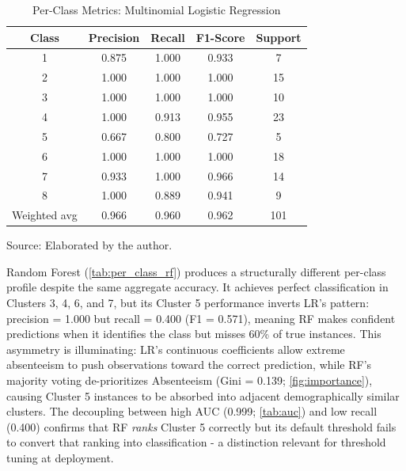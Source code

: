 \documentclass[alpha-refs,english]{RBCA_v3.0}
\begin{document}
\begin{table}[ht]
    \centering
    \begin{threeparttable}
    \caption{Per-Class Metrics: Multinomial Logistic Regression}
    \label{tab:per_class_lr}
    \begin{tabular}{ccccc}
        \toprule
        Class & Precision & Recall & F1-Score & Support \\
        \midrule
        1            & 0.875 & 1.000 & 0.933 & 7 \\
        2            & 1.000 & 1.000 & 1.000 & 15 \\
        3            & 1.000 & 1.000 & 1.000 & 10 \\
        4            & 1.000 & 0.913 & 0.955 & 23 \\
        5            & 0.667 & 0.800 & 0.727 & 5 \\
        6            & 1.000 & 1.000 & 1.000 & 18 \\
        7            & 0.933 & 1.000 & 0.966 & 14 \\
        8            & 1.000 & 0.889 & 0.941 & 9 \\
        \midrule
        Weighted avg & 0.966 & 0.960 & 0.962 & 101 \\
        \bottomrule
    \end{tabular}
    \begin{tablenotes}
        \footnotesize
        \item Source: Elaborated by the author.
    \end{tablenotes}
    \end{threeparttable}
\end{table}

Random Forest (\cref{tab:per_class_rf}) produces a structurally different 
per-class profile despite the same aggregate accuracy. It achieves perfect 
classification in Clusters 3, 4, 6, and 7, but its Cluster 5 performance 
inverts LR's pattern: precision = 1.000 but recall = 0.400 (F1 = 0.571), 
meaning RF makes confident predictions when it identifies the class but 
misses 60\% of true instances. This asymmetry is illuminating: LR's 
continuous coefficients allow extreme absenteeism to push observations 
toward the correct prediction, while RF's majority voting de-prioritizes 
Absenteeism (Gini = 0.139; \cref{fig:importance}), causing Cluster 5 
instances to be absorbed into adjacent demographically similar clusters. 
The decoupling between high AUC (0.999; \cref{tab:auc}) and low recall 
(0.400) confirms that RF \emph{ranks} Cluster 5 correctly but its default 
threshold fails to convert that ranking into classification - a distinction 
relevant for threshold tuning at deployment.
\end{document}
